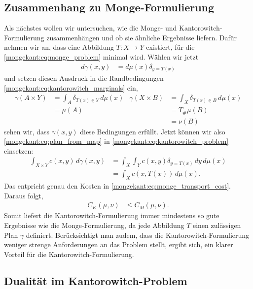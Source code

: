 \subsection{Zusammenhang zu Monge-Formulierung%
\label{mongekant:subsection:monge_kantorowitch_connection}}
Als nächstes wollen wir untersuchen,
wie die Monge- und Kantorowitch-Formulierung zusammenhängen und
ob sie ähnliche Ergebnisse liefern.
Dafür nehmen wir an,
dass eine Abbildung $T\colon X \to Y$ existiert,
für die \eqref{mongekant:eq:monge_problem} minimal wird.
Wählen wir jetzt
\begin{align}
d\gamma(x,y)
&=
d\mu(x) \delta_{y=T(x)}
\label{mongekant:eq:plan_from_map}
\end{align}
und setzen diesen Ausdruck
in die Randbedingungen \eqref{mongekant:eq:kantorowitch_marginals} ein,
\begin{align*}
\gamma(A \times Y)
&=
\int_A \delta_{T(x) \in Y}\, d\mu(x)
&
\gamma(X \times B)
&=
\int_X \delta_{T(x) \in B}\, d\mu(x)
\\
&=
\mu(A)
&&=
T_{\#}\mu\left(B\right)
\\
&&&=
\nu(B)
\end{align*}
sehen wir,
dass $\gamma(x,y)$ diese Bedingungen erfüllt.
Jetzt können wir also \eqref{mongekant:eq:plan_from_map} in
\eqref{mongekant:eq:kantorowitch_problem} einsetzen:
\begin{align*}
\int_{X \times Y} c(x,y)\, d\gamma(x,y)
&=
\int_X \int_Y c(x,y) \delta_{y=T(x)}\, dy\, d\mu(x)
\\
&=
\int_X c(x, T(x))\, d\mu(x)
.
\end{align*}
Das entpricht genau den Kosten in \eqref{mongekant:eq:monge_transport_cost}.
Daraus folgt,
\begin{align*}
C_K(\mu, \nu)
&\leq
C_M(\mu, \nu)
.
\end{align*}
Somit liefert die Kantorowitch-Formulierung immer mindestens so gute Ergebnisse
wie die Monge-Formulierung,
da jede Abbildung $T$ einen zulässigen Plan $\gamma$ definiert.
Berücksichtigt man zudem,
dass die Kantorowitch-Formulierung weniger strenge Anforderungen an das Problem stellt,
ergibt sich,
ein klarer Vorteil für die Kantorowitch-Formulierung.

\subsection{Dualität im Kantorowitch-Problem%
\label{mongekant:subsection:kantorowitch_duality}}

